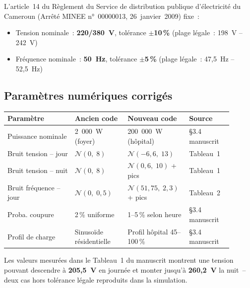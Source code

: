 \documentclass[12pt,a4paper]{article}
\begin{document}
L'article~14 du Règlement du Service de distribution publique d'électricité
du Cameroun (Arrêté MINEE n°~00000013, 26~janvier~2009) fixe~:

\begin{mdframed}[style=encadre]
\begin{itemize}
  \item Tension nominale~: \textbf{220/380~V}, tolérance \textbf{$\pm$10\,\%}
    (plage légale~: 198~V -- 242~V)
  \item Fréquence nominale~: \textbf{50~Hz}, tolérance \textbf{$\pm$5\,\%}
    (plage légale~: 47,5~Hz -- 52,5~Hz)
\end{itemize}
\end{mdframed}

\subsection{Paramètres numériques corrigés}

\begin{center}
\begin{tabularx}{\linewidth}{p{0.28\linewidth} p{0.22\linewidth}
                              p{0.22\linewidth} p{0.18\linewidth}}
\toprule
\textbf{Paramètre} & \textbf{Ancien code} & \textbf{Nouveau code}
                   & \textbf{Source} \\
\midrule
Puissance nominale &
  2~000~W (foyer) & 200~000~W (hôpital) & §3.4 manuscrit \\
Bruit tension -- jour &
  $\mathcal{N}(0,\;8)$ &
  $\mathcal{N}(-6{,}6,\;13)$ &
  Tableau~1 \\
Bruit tension -- nuit &
  $\mathcal{N}(0,\;8)$ &
  $\mathcal{N}(0{,}6,\;10)$ + pics &
  Tableau~1 \\
Bruit fréquence -- jour &
  $\mathcal{N}(0,\;0{,}5)$ &
  $\mathcal{N}(51{,}75,\;2{,}3)$ + pics &
  Tableau~2 \\
Proba. coupure &
  2\,\% uniforme &
  1--5\,\% selon heure &
  §3.4 manuscrit \\
Profil de charge &
  Sinusoïde résidentielle &
  Profil hôpital 45--100\,\% &
  §3.4 manuscrit \\
\bottomrule
\end{tabularx}
\end{center}

Les valeurs mesurées dans le Tableau~1 du manuscrit montrent
une tension pouvant descendre à \textbf{205,5~V} en journée et
monter jusqu'à \textbf{260,2~V} la nuit~-- deux cas hors tolérance légale
reproduits dans la simulation.
\end{document}
